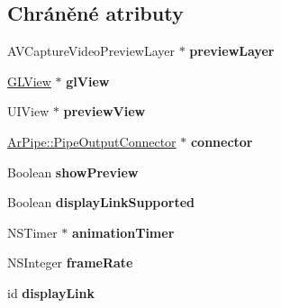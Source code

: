 \subsection*{Chráněné atributy}
\begin{DoxyCompactItemize}
\item 
\hypertarget{interface_base_ar_view_aee083bf02dd87f4479f1ca82de374aa8}{A\-V\-Capture\-Video\-Preview\-Layer $\ast$ {\bfseries preview\-Layer}}\label{d5/d64/interface_base_ar_view_aee083bf02dd87f4479f1ca82de374aa8}

\item 
\hypertarget{interface_base_ar_view_af6d719fef8d99c5fe86e64e236a8e20b}{\hyperlink{interface_g_l_view}{G\-L\-View} $\ast$ {\bfseries gl\-View}}\label{d5/d64/interface_base_ar_view_af6d719fef8d99c5fe86e64e236a8e20b}

\item 
\hypertarget{interface_base_ar_view_a5e822ab26b3730db244daab10e63244d}{U\-I\-View $\ast$ {\bfseries preview\-View}}\label{d5/d64/interface_base_ar_view_a5e822ab26b3730db244daab10e63244d}

\item 
\hypertarget{interface_base_ar_view_a365837b2f7c9e1a1428e7b2d6179e844}{\hyperlink{class_ar_pipe_1_1_pipe_output_connector}{Ar\-Pipe\-::\-Pipe\-Output\-Connector} $\ast$ {\bfseries connector}}\label{d5/d64/interface_base_ar_view_a365837b2f7c9e1a1428e7b2d6179e844}

\item 
\hypertarget{interface_base_ar_view_a1c6bcb43c046e236ff516e2e1fab41d0}{Boolean {\bfseries show\-Preview}}\label{d5/d64/interface_base_ar_view_a1c6bcb43c046e236ff516e2e1fab41d0}

\item 
\hypertarget{interface_base_ar_view_a82f0c58d3b54311a4f5e6800fb237f64}{Boolean {\bfseries display\-Link\-Supported}}\label{d5/d64/interface_base_ar_view_a82f0c58d3b54311a4f5e6800fb237f64}

\item 
\hypertarget{interface_base_ar_view_adf731ae38bf4ec76aff9d982cbf5e668}{N\-S\-Timer $\ast$ {\bfseries animation\-Timer}}\label{d5/d64/interface_base_ar_view_adf731ae38bf4ec76aff9d982cbf5e668}

\item 
\hypertarget{interface_base_ar_view_af3eec68bfde68e2541b7ee6ed4862241}{N\-S\-Integer {\bfseries frame\-Rate}}\label{d5/d64/interface_base_ar_view_af3eec68bfde68e2541b7ee6ed4862241}

\item 
\hypertarget{interface_base_ar_view_a3c1bb73d439b7597066db4ad9af46e47}{id {\bfseries display\-Link}}\label{d5/d64/interface_base_ar_view_a3c1bb73d439b7597066db4ad9af46e47}

\end{DoxyCompactItemize}
